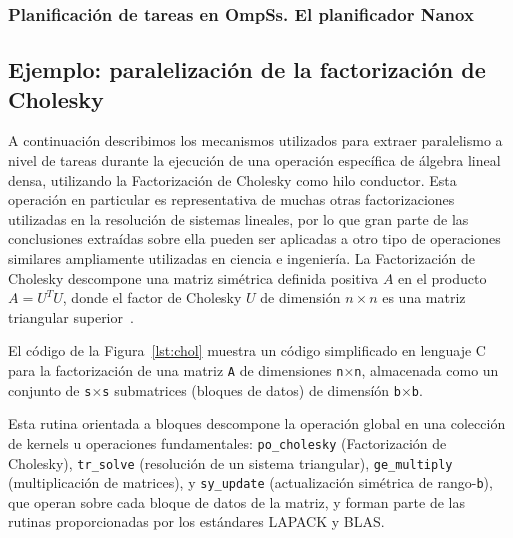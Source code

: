 \subsubsection{Planificación de tareas en OmpSs. El planificador Nanox}

\subsection{Ejemplo: paralelización de la factorización de Cholesky}

A continuación describimos los mecanismos utilizados para extraer paralelismo a nivel de tareas
durante la ejecución de una operación específica de álgebra lineal densa, utilizando la Factorización
de Cholesky como hilo conductor. Esta operación en particular es representativa de muchas
otras factorizaciones utilizadas en la resolución de sistemas lineales, por lo que gran parte de las
conclusiones extraídas sobre ella pueden ser aplicadas a otro tipo de operaciones similares ampliamente
utilizadas en ciencia e ingeniería.
%
La Factorización de Cholesky descompone una matriz simétrica definida positiva
$A$ en el producto $A=U^TU$, donde el factor de Cholesky $U$ de dimensión $n \times n$ es una matriz triangular
superior~\cite{GVL3}. 



El código de la Figura~\ref{lst:chol} muestra un código simplificado en lenguaje C para
la factorización de una matriz {\tt A} de dimensiones {\tt n}$\times${\tt n}, 
almacenada como un conjunto de {\tt s}$\times${\tt s} submatrices (bloques de datos) de dimensíón 
{\tt b}$\times${\tt b}.

Esta rutina orientada a bloques descompone la operación global en una colección de kernels u operaciones
fundamentales:
{\tt po\_cholesky} (Factorización de Cholesky), {\tt tr\_solve} (resolución de un sistema triangular),
{\tt ge\_multiply} (multiplicación de matrices), y 
{\tt sy\_update} (actualización simétrica de rango-{\tt b}), que operan sobre cada bloque
de datos de la matriz, y forman parte de las rutinas proporcionadas por los estándares LAPACK y BLAS. 

